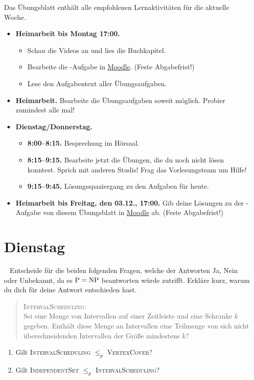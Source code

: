 \documentclass{uebung_cs}
\begin{document}
Das Übungsblatt enthält alle empfohlenen Lernaktivitäten für die aktuelle Woche.

\begin{itemize}
\item \textbf{Heimarbeit bis Montag 17:00.}
    \begin{itemize}
    \item 
    Schau die Videos an und lies die Buchkapitel.
    \item Bearbeite die -Aufgabe in \href{https://moodle.studiumdigitale.uni-frankfurt.de/moodle/course/view.php?id=2241}{Moodle}. (Feste Abgabefrist!)
    \item Lese den Aufgabentext aller Übungsaufgaben.
    \end{itemize}
\item \textbf{Heimarbeit.} Bearbeite die Übungsaufgaben soweit möglich. Probier zumindest alle mal!
\item \textbf{Dienstag/Donnerstag.}
\begin{itemize}
    \item \textbf{8:00--8:15.} Besprechung im Hörsaal.
    \item \textbf{8:15--9:15.} Bearbeite jetzt die Übungen, die du noch nicht lösen konntest. Sprich mit anderen Studis! Frag das Vorlesungsteam um Hilfe!
    \item \textbf{9:15--9:45.} Lösungsspaziergang zu den Aufgaben für heute.
\end{itemize}

\item \textbf{Heimarbeit bis Freitag, den 03.12., 17:00.} Gib deine Lösungen zu der -Aufgabe von diesem Übungsblatt in \href{https://moodle.studiumdigitale.uni-frankfurt.de/moodle/course/view.php?id=2241}{Moodle} ab. (Feste Abgabefrist!)
\end{itemize}

\section*{Dienstag}

\begin{aufgabe}[NP]\
	Entscheide für die beiden folgenden Fragen, welche der Antworten \glqq Ja\grqq{}, \glqq Nein\grqq{} oder \glqq Unbekannt, da es $\mathrm{P} = \mathrm{NP}$ beantworten würde\grqq{} zutrifft. Erkläre kurz, warum du dich für deine Antwort entschieden hast.

	\begin{quote}
		\textsc{IntervalScheduling}: \\
		Sei eine Menge von Intervallen auf einer Zeitleiste und eine Schranke $k$ gegeben. Enthält diese Menge an Intervallen eine Teilmenge von sich nicht überschneidenden Intervallen der Größe mindestens $k$?
	\end{quote}
	
	\begin{enumerate}
		\item Gilt \textsc{IntervalScheduling} $\leq_p$ \textsc{VertexCover}?
		\item Gilt \textsc{IndependentSet} $\leq_p$ \textsc{IntervalScheduling}?
	\end{enumerate}
\end{aufgabe}
\end{document}

